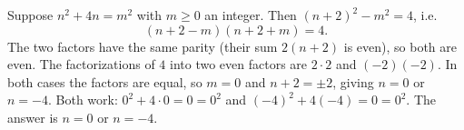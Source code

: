 Suppose $n^2+4n=m^2$ with $m\ge0$ an integer. Then $(n+2)^2-m^2=4$, i.e.
\[
(n+2-m)(n+2+m)=4 .
\]
The two factors have the same parity (their sum $2(n+2)$ is even), so both are even. The factorizations of $4$ into two even factors are $2\cdot2$ and $(-2)(-2)$. In both cases the factors are equal, so $m=0$ and $n+2=\pm2$, giving $n=0$ or $n=-4$. Both work: $0^2+4\cdot0=0=0^2$ and $(-4)^2+4(-4)=0=0^2$. The answer is $\boxed{n=0\text{ or }n=-4}$.
